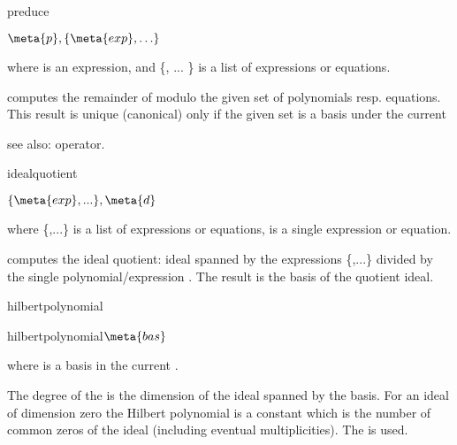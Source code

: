 \begin{Operator}{preduce}
\begin{Syntax}

 \(\meta{p}, \{\meta{exp}, \ldots \}\)

\end{Syntax}

where  is an expression, and \{, ... \} is
a list of expressions or equations.


 computes the remainder of 
modulo the given set of polynomials resp. equations.
This result is unique (canonical) only if the given set
is a  basis under the current 

see also:  operator.

\end{Operator}



\begin{Operator}{idealquotient}
\begin{Syntax}

\(\{\meta{exp}, ...\}, \meta{d}\)

\end{Syntax}
where \{,...\} is a list of 
expressions or equations,   is a single expression or equation.


 computes the ideal quotient:
ideal spanned by the expressions \{,...\}
divided by the single polynomial/expression . The result
is the  basis of the quotient ideal.
\end{Operator}


\begin{Operator}{hilbertpolynomial}
\begin{Syntax}

  hilbertpolynomial\(\meta{bas}\)

\end{Syntax}
where  is a  basis in the
current .

The degree of the  is the
dimension of the ideal spanned by the basis. For an
ideal of dimension zero the Hilbert polynomial is a
constant which is the number of common zeros of the
ideal (including eventual multiplicities).
The  is used.
\end{Operator}


